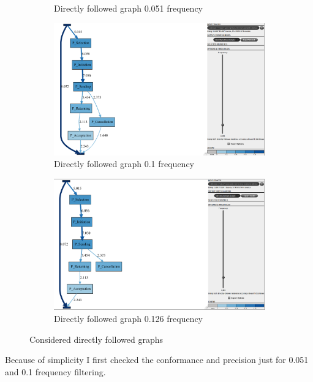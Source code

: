 \begin{figure}[!htbp]
\begin{subfigure}{.4\textwidth}
  \caption{Directly followed graph 0.051 frequency}
  \label{fig:P_DFG0-051}
\end{subfigure}
\begin{subfigure}{.4\textwidth}
  \centering
  \includegraphics[width=\linewidth]{P_DirectlyFollowedFreq0-1.PNG}
  \caption{Directly followed graph 0.1 frequency}
  \label{fig:P_DFG0-1}
\end{subfigure}
\begin{subfigure}{.4\textwidth}
  \centering
  \includegraphics[width=\linewidth]{P_DirectlyFollowedFreq0-126.PNG}
  \caption{Directly followed graph 0.126 frequency}
  \label{fig:P_DFG0-126}
\end{subfigure}
\caption{Considered directly followed graphs}
\label{fig:P_Direct}
\end{figure}

Because of simplicity I first checked the conformance and precision just for 0.051 and 0.1 frequency filtering. 

